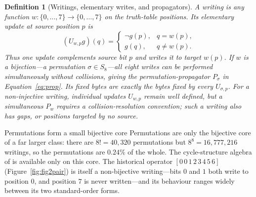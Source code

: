 \documentclass[man,12pt,floatsintext,donotrepeattitle]{apa7}
\newcommand{\sig}{\sigma}
\newcommand{\secref}[1]{\emph{\nameref{#1}}}
\newtheorem{definition}{Definition}
\begin{document}
\begin{definition}[Writings, elementary writes, and propagators]\label{def:writing}
A \emph{writing} is any function $w\colon\{0,\dots,7\}\to\{0,\dots,7\}$ on the
truth-table positions. Its elementary update at source position $p$ is
\[
(U_{w,p}g)(q)=
\begin{cases}
\lnot g(p),&q=w(p),\\
g(q),&q\ne w(p).
\end{cases}
\]
Thus one update complements source bit $p$ and writes it to target $w(p)$. If
$w$ is a bijection---a permutation $\sig\in S_8$---all eight writes can be
performed simultaneously without collisions, giving the
\emph{permutation-propagator} $P_\sig$ in Equation~\eqref{eq:prop}. Its fixed
bytes are exactly the bytes fixed by every $U_{\sig,p}$. For a non-injective
writing, individual updates $U_{w,p}$ remain well defined, but a simultaneous
$P_w$ requires a collision-resolution convention; such a writing also has
\emph{gaps}, or positions targeted by no source.
\end{definition}

\begin{observation}[label={obs:core}]{Permutations form a small bijective core}
Permutations are only the bijective core of a far larger class: there are
$8!=40{,}320$ permutations but $8^{8}=16{,}777{,}216$ writings, so the
permutations are $0.24\%$ of the whole. The cycle-structure algebra of
\secref{sec:classification} is available only on this core. The historical
operator $[0\,0\,1\,2\,3\,4\,5\,6]$ (Figure~\ref{fig:fig2pair}) is itself a
non-bijective writing---bits $0$ and $1$ both write to position $0$, and
position $7$ is never written---and its behaviour ranges widely between its two
standard-order forms.
\end{observation}
\end{document}
